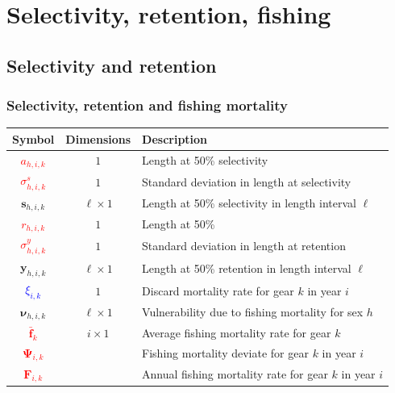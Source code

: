 \documentclass{beamer}
\begin{document}

\section{Selectivity, retention, fishing}


\subsection{Selectivity and retention}
\begin{frame}
\frametitle{Selectivity, retention and fishing mortality}
\begin{table}
  \centering
  \begin{tabular}{ccl}
  \hline
  Symbol & Dimensions & Description \\
  \hline
      \textcolor{red}{$a_{h,i,k}$} & $1$ & Length at 50\% selectivity \\
      \textcolor{red}{$\sigma^s_{h,i,k}$} & $1$ & Standard deviation in length at selectivity \\
      $\boldsymbol{s}_{h,i,k}$ & $\ell \times 1$ & Length at 50\% selectivity in length interval $\ell$ \\
      \textcolor{red}{$r_{h,i,k}$} & $1$ & Length at 50\% \\
      \textcolor{red}{$\sigma^y_{h,i,k}$} & $1$ & Standard deviation in length at retention \\
      $\boldsymbol{y}_{h,i,k}$ & $\ell \times 1$ & Length at 50\% retention in length interval $\ell$ \\
      \textcolor{blue}{$\xi_{i,k}$} & $1$ & Discard mortality rate for gear $k$
      in year $i$ \\
      $\boldsymbol\nu_{h,i,k}$ & $\ell \times 1$ & Vulnerability due to fishing mortality for sex $h$ \\
      \textcolor{red}{$\bar{\boldsymbol{f}}_k$} & $i \times 1$ & Average fishing mortality rate for gear $k$ \\
      \textcolor{red}{$\boldsymbol\Psi_{i,k}$} & & Fishing mortality deviate for gear $k$ in year $i$ \\
      \textcolor{red}{$\boldsymbol{F}_{i,k}$} & & Annual fishing mortality rate for gear $k$ in year $i$ \\
  \hline
  \end{tabular}
\end{table}
\end{frame}
\end{document}
